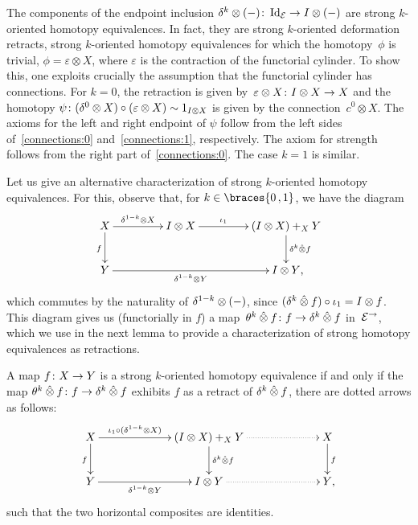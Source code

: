 \documentclass[reqno,10pt,a4paper,oneside,draft]{amsart}
\begin{document}
{{\begin{remark} \label{thm:endpoint-are-she}
The components of the endpoint inclusion $\delta^k \otimes (-) \colon \operatorname{Id}_{\mathcal{E}} \to I \otimes (-)$ are strong $k$-oriented homotopy equivalences.
In fact, they are strong $k$-oriented deformation retracts, \ie strong $k$-oriented homotopy equivalences for which the homotopy~$\phi$ is trivial, \ie $\phi = \varepsilon \otimes X$, where $\varepsilon$ is the contraction of the functorial cylinder.
To show this, one exploits crucially the assumption that the functorial cylinder has connections.
For $k = 0$, the retraction is given by~$\varepsilon \otimes X \colon I \otimes X \to X$ and the homotopy $\psi \colon (\delta^0 \otimes X) \circ (\varepsilon \otimes X)  \sim
1_{I \otimes X}$ is given by the connection~$c^0 \otimes X$.
The axioms for the left and right endpoint of $\psi$ follow from the left sides of~\eqref{connections:0} and~\eqref{connections:1}, respectively.
The axiom for strength follows from the right part of~\eqref{connections:0}.
The case $k = 1$ is similar.
\end{remark}

Let us give an alternative characterization of strong $k$-oriented homotopy equivalences.
For this, observe that, for $k \in \braces{0\,, 1}$, we have the diagram
\begin{equation} \label{equ:thetak}
\begin{gathered}
\xymatrix@C+2em{
  X
  \ar[r]^-{\kcylinv \otimes X}
  \ar[d]_{f}
&
 \interval \otimes X
 \ar[r]^-{\iota_1}
 &
  (\interval \otimes X) +_X Y \ar[d]^{\kcyl \hatotimes f}
  \\
  Y
  \ar[rr]_-{\kcylinv \otimes Y}
  &
&
  \interval \otimes Y \rlap{,} 
}
\end{gathered}
\end{equation}
which commutes by the naturality of $\delta^{1-k} \otimes (-)$, since $(\delta^k \mathbin{\hat{\otimes}} f) \mathbin{\circ} \iota_1 = I \otimes f$.
This diagram gives us (functorially in $f$) a map~$\theta^k \mathbin{\hat{\otimes}} f \colon f \to \delta^k \mathbin{\hat{\otimes}} f$ in~$\mathcal{E}^\to$, which we use in the next lemma to provide a characterization of strong homotopy equivalences as retractions.

\begin{lemma} \label{strong-h-equiv-as-section-non-alg}
A map $f \colon X \to Y$ is a strong $k$-oriented homotopy equivalence if and only if the map $\theta^k \mathbin{\hat{\otimes}} f  \colon f \to \delta^k \mathbin{\hat{\otimes}} f$ exhibits $f$ as a retract of $\delta^k \mathbin{\hat{\otimes}} f$, \ie there are dotted arrows as follows:
\[
\xymatrix@C+4em{
  X
  \ar[r]^-{\iota_1 \cc (\kcylinv \otimes X)}
  \ar[d]_f
&
  (\interval \otimes X) +_X Y
  \ar[d]^{\kcyl \hatotimes f}
  \ar@{.>}[r]
&
  X
  \ar[d]^f
\\
  Y
  \ar[r]_-{\kcylinv \otimes Y}
&
  \interval \otimes Y
  \ar@{.>}[r]
&
  Y
\rlap{,}}
\]
such that the two horizontal composites are identities.
\end{lemma}

}}
\end{document}
